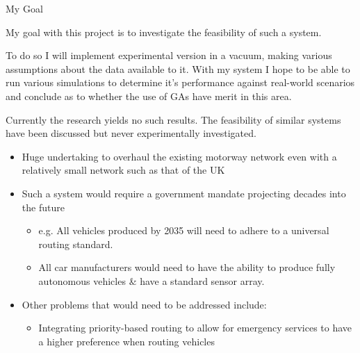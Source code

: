 \documentclass{beamer}
\begin{document}
\begin{frame}{My Goal}

    My goal with this project is to investigate the feasibility of such a system. 

    To do so I will implement experimental version in a vacuum, making various assumptions about the data available to it. 
    With my system I hope to be able to run various simulations to determine it's performance against real-world scenarios and conclude as to whether the use of GAs have merit in this area. 

    Currently the research yields no such results. The feasibility of similar systems have been discussed\cite{kalaOnroadIntelligentVehicles2016} but never experimentally investigated.
    
\end{frame}

\begin{frame}
    


    \begin{itemize}
        \item Huge undertaking to overhaul the existing motorway network even with a relatively small network such as that of the UK
        \item Such a system would require a government mandate projecting decades into the future
            \begin{itemize}
                \item e.g. All vehicles produced by 2035 will need to adhere to a universal routing standard.
                \item All car manufacturers would need to have the ability to produce fully autonomous vehicles \& have a standard sensor array.
            \end{itemize}
        \item Other problems that would need to be addressed include:
            \begin{itemize}
                \item Integrating priority-based routing to allow for emergency services to have a higher preference when routing vehicles
            \end{itemize}
    \end{itemize}
\end{frame}
\end{document}
